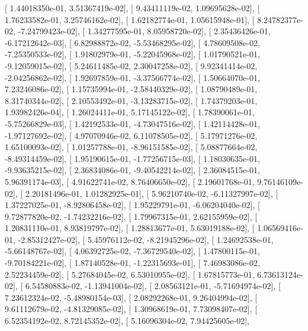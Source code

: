 \documentclass{article}
\begin{document}
       [  1.44018350e-01,   3.51367419e-02],
       [  9.43411119e-02,   1.09695628e-02],
       [  1.76233582e-01,   3.25746162e-02],
       [  1.62182774e-01,   1.05615948e-01],
       [  8.24782377e-02,  -7.24799423e-02],
       [  1.34277595e-01,   8.05958720e-02],
       [  2.35436426e-01,  -6.17212642e-03],
       [  6.82988872e-02,  -5.53468295e-02],
       [  4.78609508e-02,  -7.25350533e-02],
       [  1.91802979e-01,  -5.22045968e-02],
       [  1.01790521e-01,  -9.12059015e-02],
       [  5.24611485e-02,   2.30047258e-02],
       [  9.92341414e-02,  -2.04256862e-02],
       [  1.92697859e-01,  -3.37566774e-02],
       [  1.50664070e-01,   7.23246086e-02],
       [  1.15735994e-01,  -2.58440329e-02],
       [  1.08790489e-01,   8.31740344e-02],
       [  2.10553492e-01,  -3.13283715e-02],
       [  1.74379203e-01,   1.93982426e-04],
       [  1.26024411e-01,   5.17145122e-02],
       [  1.78390061e-01,  -5.75266829e-03],
       [  1.42192533e-01,  -4.73047516e-02],
       [  1.42114428e-01,  -1.97127692e-02],
       [  4.97070946e-02,   6.11078505e-02],
       [  5.17971276e-02,   1.65100093e-02],
       [  1.01257788e-01,  -8.96151585e-02],
       [  5.08877664e-02,  -8.49314459e-02],
       [  1.95190615e-01,  -1.77256715e-03],
       [  1.18030635e-01,  -9.93635215e-02],
       [  2.36834086e-01,  -9.40542214e-02],
       [  2.36084515e-01,   5.96391174e-03],
       [  4.91622741e-02,   8.76406650e-02],
       [  2.19601768e-01,   9.76146109e-02],
       [  2.20181496e-01,   1.01282925e-01],
       [  5.96210740e-02,  -6.11327997e-02],
       [  1.37227025e-01,  -8.92806458e-02],
       [  1.95229791e-01,  -6.06204040e-02],
       [  9.72877820e-02,  -1.74232216e-02],
       [  1.79967315e-01,   2.62155959e-02],
       [  1.20831110e-01,   8.93819797e-02],
       [  1.28813677e-01,   5.63019188e-02],
       [  1.06569416e-01,  -2.85312427e-02],
       [  5.45976112e-02,  -8.21945296e-02],
       [  1.24692538e-01,  -5.66148767e-02],
       [  4.06392725e-02,  -7.36729540e-02],
       [  1.47800115e-01,  -9.70184221e-02],
       [  1.87140528e-01,  -1.22315693e-01],
       [  7.46983086e-02,   2.52234459e-02],
       [  5.27684045e-02,   6.53010955e-02],
       [  1.67815773e-01,   6.73613124e-02],
       [  6.54580883e-02,  -1.13941004e-02],
       [  2.08563121e-01,  -5.71694974e-02],
       [  7.23612324e-02,  -5.48980154e-03],
       [  2.08292268e-01,   9.26404994e-02],
       [  9.61112679e-02,  -4.81329085e-02],
       [  1.30968619e-01,   7.73098407e-02],
       [  6.52354192e-02,   8.72145352e-02],
       [  5.16096304e-02,   7.94425605e-02],
\end{document}
